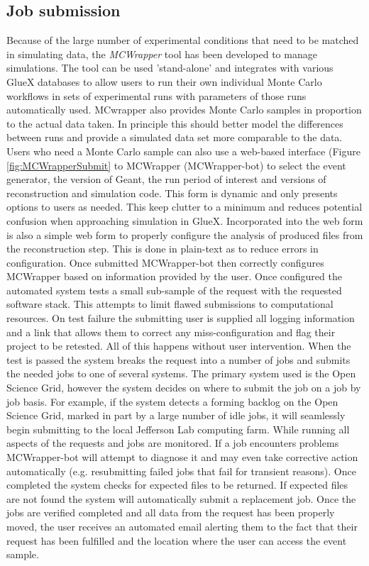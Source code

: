\subsection{Job submission \label{sec:jobsubmission}}
Because of the large number of experimental conditions that need to be matched in simulating data, the \emph{MCWrapper} tool has been developed to manage simulations. The tool can be used 'stand-alone' and integrates with various GlueX databases to allow users to run their own individual Monte Carlo workflows in sets of experimental runs with parameters of those runs automatically used.  MCwrapper also provides Monte Carlo samples in proportion to the actual data taken.  In principle this should better model the differences between runs and provide a simulated data set more comparable to the data.  Users who need a Monte Carlo sample can also use a web-based interface (Figure \ref{fig:MCWrapperSubmit} to MCWrapper (MCWrapper-bot) to select the event generator, the version of Geant, the run period of interest and versions of reconstruction and simulation code. This form is dynamic and only presents options to users as needed.  This keep clutter to a minimum and reduces potential confusion when approaching simulation in GlueX. Incorporated into the web form is also a simple web form to properly configure the analysis of produced files from the reconstruction step.  This is done in plain-text as to reduce errors in configuration. Once submitted MCWrapper-bot then correctly configures MCWrapper based on information provided by the user.  Once configured the automated system tests a small sub-sample of the request with the requested software stack.  This attempts to limit flawed submissions to computational resources.  On test failure the submitting user is supplied all logging information and a link that allows them to correct any miss-configuration and flag their project to be retested.  All of this happens without user intervention.  When the test is passed the system breaks the request into a number of jobs and submits the needed jobs to one of several systems.  The primary system used is the Open Science Grid, however the system decides on where to submit the job on a job by job basis. For example, if the system detects a forming backlog on the Open Science Grid, marked in part by a large number of idle jobs, it will seamlessly begin submitting to the local Jefferson Lab computing farm. While running all aspects of the requests and jobs are monitored.  If a job encounters problems MCWrapper-bot will attempt to diagnose it and may even take corrective action automatically (e.g. resubmitting failed jobs that fail for transient reasons). Once completed the system checks for expected files to be returned.  If expected files are not found the system will automatically submit a replacement job. Once the jobs are verified completed and all data from the request has been properly moved, the user receives an automated email alerting them to the fact that their request has been fulfilled and the location where the user can access the event sample.\newline

